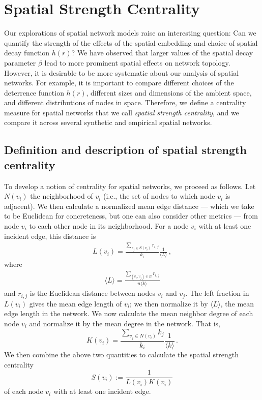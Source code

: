 \documentclass[%
 reprint,
 amsmath,amssymb,
 aps,
]{revtex4-1}
\begin{document}

\section{Spatial Strength Centrality} \label{sec:spatial_strength}

Our explorations of spatial network models raise an interesting question: Can we quantify the strength of the effects of the spatial embedding and choice of spatial decay function $h(r)$? We have observed that larger values of the spatial decay parameter $\beta$ lead to more prominent spatial effects on network topology. 
However, it is desirable to be more systematic about our analysis of spatial networks. For example, it is important to compare different choices of the deterrence function $h(r)$, different sizes and dimensions of the ambient space, and different distributions of nodes in space. Therefore, we define a centrality measure for spatial networks that we call \emph{spatial strength centrality}, and we compare it across several synthetic and empirical spatial networks.


\subsection{Definition and description of spatial strength centrality}

To develop a notion of centrality for spatial networks, we proceed as follows. Let $N(v_i)$ the neighborhood of $v_i$ (i.e., the set of nodes to which node $v_i$ is adjacent). We then calculate a normalized mean edge distance --- which we take to be Euclidean for concreteness, but one can also consider other metrics --- from node $v_i$ to each other node in its neighborhood. For a node $v_i$ with at least one incident edge, this distance is
\begin{align}
    L(v_i) = \frac{\sum_{v_j \in N(v_i)}r_{i,j}}{k_i} \frac{1}{{\langle L \rangle}}\,,
\label{eq:v_edge_length}
\end{align}
where
\begin{align}
    \langle L \rangle = \frac{\sum_{(v_i, v_j) \in E}r_{i,j}}{n \langle k \rangle}
\end{align}
and $r_{i,j}$ is the Euclidean distance between nodes $v_i$ and $v_j$. The left fraction in $L(v_i)$ gives the mean edge length of $v_i$; we then normalize it by $\langle L \rangle$, the mean edge length in the network. We now calculate the mean neighbor degree of each node $v_i$ and normalize it by the mean degree in the network. That is,
\begin{equation}
    K(v_i) = \frac{\sum_{v_j \in N(v_i)} k_j}{k_i} \frac{1}{\langle k \rangle}\,.
\end{equation}
We then combine the above two quantities to calculate the spatial strength centrality
\begin{equation} \label{eq:spatial_strength}
    S(v_i) := \frac{1}{L(v_i)K(v_i)}
\end{equation}
of each node $v_i$ with at least one incident edge.
\end{document}
